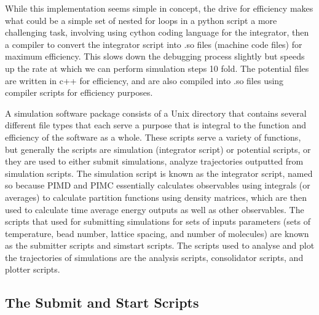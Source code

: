 \documentclass[11pt]{article}
\begin{document}
While this implementation seems simple in concept, the drive for efficiency makes what could be a simple set of nested for loops in a python script a more challenging task, involving using cython coding
language for the integrator, then a compiler to convert the integrator script into .so files (machine code files) for maximum efficiency. This slows down the debugging process slightly but speeds up the rate at which we can perform simulation steps 10 fold. The potential files are written in c++ for efficiency, and are also compiled into .so files using compiler scripts for efficiency purposes.

A simulation software package consists of a Unix directory that contains several different file types that each serve a purpose that is integral to the function and efficiency of the software as a whole. These scripts serve a variety of functions, but generally the scripts are simulation (integrator script) or potential scripts, or they are used to either submit simulations, analyze trajectories outputted from simulation scripts. The simulation script is known as the integrator script, named so because PIMD and PIMC essentially calculates observables using integrals (or averages) to calculate partition functions using density matrices, which are then used to calculate time average energy outputs as well as other observables. The scripts that used for submitting simulations for sets of inputs parameters (sets of temperature, bead number, lattice spacing, and number of molecules) are known as the submitter scripts and simstart scripts. The scripts used to analyse and plot the trajectories of simulations are the analysis scripts, consolidator scripts, and plotter scripts. 

\subsection{The Submit and Start Scripts}
\end{document}
